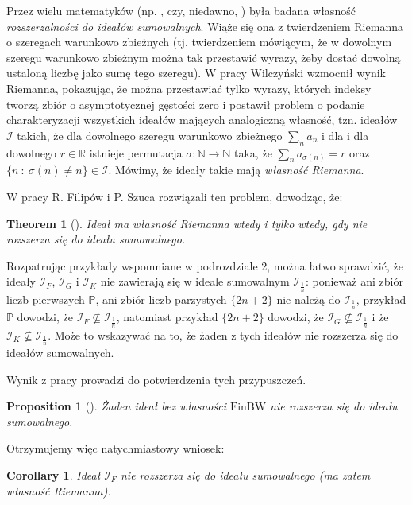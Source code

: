 \documentclass{amsart}
\newtheorem{thm}{Theorem}
\newtheorem{prop}{Proposition}
\newtheorem{cor}{Corollary}
\theoremstyle{definition}
\theoremstyle{definition}
\newcommand{\N}{{\mathbb N}}
\newcommand{\R}{{\mathbb R}}
\newcommand{\I}{\mathcal I}
\newcommand{\finbw}{\text{FinBW}}
\begin{document}
Przez wielu matematyków (np. \cite{Au}, \cite{FreedSem} czy, niedawno, \cite{Klinga}) była badana własność \emph{rozszerzalności do ideałów sumowalnych}. Wiąże się ona z twierdzeniem Riemanna o szeregach warunkowo zbieżnych (tj. twierdzeniem mówiącym, że w dowolnym szeregu warunkowo zbieżnym można tak przestawić wyrazy, żeby dostać dowolną ustaloną liczbę jako sumę tego szeregu). W pracy \cite{W} Wilczyński wzmocnił wynik Riemanna, pokazując, że można przestawiać tylko wyrazy, których indeksy tworzą zbiór o asymptotycznej gęstości zero i postawił problem o podanie charakteryzacji wszystkich ideałów mających analogiczną własność, tzn. ideałów $\I$ takich, że dla dowolnego szeregu warunkowo zbieżnego $\sum_n a_n$ i dla i dla dowolnego $r\in\R$ istnieje permutacja $\sigma \colon \N\to\N$ taka, że $\sum_n a_{\sigma(n)} = r$ oraz $\{n\ :\ \sigma(n)\neq n\}\in\I$. Mówimy, że ideały takie mają \emph{własność Riemanna}.

W pracy \cite{H3} R. Filipów i P. Szuca rozwiązali ten problem, dowodząc, że:
\begin{thm}[\cite{H3}]
Ideał ma własność Riemanna wtedy i tylko wtedy, gdy nie rozszerza się do ideału sumowalnego.
\end{thm}

Rozpatrując przykłady wspomniane w podrozdziale 2, można łatwo sprawdzić, że ideały $\I_F$, $\I_G$ i $\I_K$ nie zawierają się w ideale sumowalnym $\I_{\frac{1}{n}}$: ponieważ ani zbiór liczb pierwszych $\mathbb{P}$, ani zbiór liczb parzystych $\{2n+2\}$ nie należą do $\I_{\frac{1}{n}}$, przykład $\mathbb{P}$ dowodzi, że $\I_F \nsubseteq \I_{\frac{1}{n}}$, natomiast przykład $\{2n+2\}$ dowodzi, że $\I_G \nsubseteq \I_{\frac{1}{n}}$ i że $\I_K \nsubseteq \I_{\frac{1}{n}}$. Może to wskazywać na to, że żaden z tych ideałów nie rozszerza się do ideałów sumowalnych.

Wynik z pracy \cite{H1} prowadzi do potwierdzenia tych przypuszczeń.
\begin{prop}[\cite{H1}]
Żaden ideał bez własności $\finbw$ nie rozszerza się do ideału sumowalnego.
\end{prop}

Otrzymujemy więc natychmiastowy wniosek:
\begin{cor}
Ideał $\I_F$ nie rozszerza się do ideału sumowalnego (ma zatem własność Riemanna).
\end{cor}




    \color{black}


\end{document}
